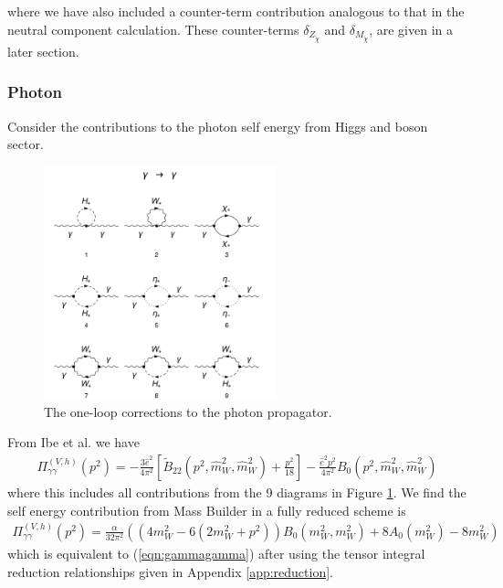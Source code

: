 \documentclass[11pt]{article}
\newcommand{\mb}{\textsf{Mass Builder} }
\begin{document}
where we have also included a counter-term contribution analogous to that in the neutral component calculation.  These counter-terms $\delta_{Z_{\tilde{\chi}}}$ and $\delta_{M_{\tilde{\chi}}}$, are given in a later section.





\subsubsection{Photon}

Consider the contributions to the photon self energy from Higgs and boson sector. 

\begin{figure}[b!]
\center
\includegraphics[width=0.6\textwidth]{diagrams_V[1]_1.pdf}
\caption{The one-loop corrections to the photon propagator.}\label{fig:gammagamma}
\end{figure}

From Ibe et al. we have
\begin{align}
\Pi_{\gamma \gamma}^{(V, h)}(p^2) =
-\frac{3 \hat{e}^2}{4\pi^2}
\left[ \tilde{B}_{22}(p^2, \hat{m}_W^2, \hat{m}_W^2) + \frac{p^2}{18} \right]
-\frac{\hat{e}^2 p^2}{4\pi^2} B_0(p^2, \hat{m}_W^2, \hat{m}_W^2) \label{eqn:gammagamma}
\end{align}
where this includes all contributions from the 9 diagrams in Figure \ref{fig:gammagamma}.  We find the self energy contribution from \mb in a fully reduced scheme is
\begin{align}
\Pi_{\gamma \gamma}^{(V, h)}(p^2) = \frac{\alpha}{32\pi^2} \left( \left(4m_W^2-6(2m_W^2+p^2)\right)B_0(m_W^2,m_W^2)+8 A_0(m_W^2)-8m_W^2\right)
\end{align}
which is equivalent to (\ref{eqn:gammagamma}) after using the tensor integral reduction relationships given in Appendix \ref{app:reduction}.
\end{document}
